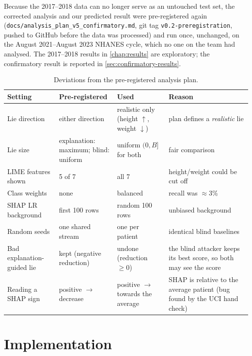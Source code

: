 \documentclass[12pt, a4paper, oneside]{report}
\theoremstyle{definition}
\begin{document}
Because the 2017--2018 data can no longer serve as an untouched test
set, the corrected analysis and our predicted result were pre-registered
again (\texttt{docs/analysis\_plan\_v5\_confirmatory.md}, git tag
\texttt{v0.2-preregistration}, pushed to GitHub before the data was
processed) and run once, unchanged, on the August 2021--August 2023
NHANES cycle, which no one on the team had analysed. The 2017--2018
results in \cref{chap:results} are exploratory; the confirmatory result
is reported in \cref{sec:confirmatory-results}.

\begin{table}[htbp]
  \centering
  \caption{Deviations from the pre-registered analysis plan.}
  \label{tab:deviations}
  \small
  \begin{tabular}{p{2.8cm}p{3.4cm}p{3.4cm}p{3.9cm}}
    \toprule
    Setting & Pre-registered & Used & Reason \\
    \midrule
    Lie direction & either direction & realistic only (height $\uparrow$, weight $\downarrow$) & plan defines a \emph{realistic} lie \\
    Lie size & explanation: maximum; blind: uniform & uniform $(0, B]$ for both & fair comparison \\
    LIME features shown & 5 of 7 & all 7 & height/weight could be cut off \\
    Class weights & none & balanced & recall was $\approx$3\% \\
    SHAP LR background & first 100 rows & random 100 rows & unbiased background \\
    Random seeds & one shared stream & one per patient & identical blind baselines \\
    Bad explanation-guided lie & kept (negative reduction) & undone (reduction $\geq 0$) & the blind attacker keeps its best score, so both may see the score \\
    Reading a SHAP sign & positive $\to$ decrease & positive $\to$ towards the average & SHAP is relative to the average patient (bug found by the UCI hand check) \\
    \bottomrule
  \end{tabular}
\end{table}

\chapter{Implementation}
\label{chap:implementation}
\end{document}

